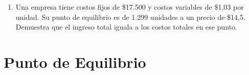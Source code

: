 \documentclass[12pt,a4paper]{article}
\newcommand{\lastanswerspace}{\vspace{2cm}}
\begin{document}
\begin{enumerate}[label=\textbf{\arabic*.}, leftmargin=*, itemsep=0pt]
\item Una empresa tiene costos fijos de \$17.500 y costos variables de \$1,03 por unidad. Su punto de equilibrio es de 1.299 unidades a un precio de \$14,5. Demuestra que el ingreso total iguala a los costos totales en ese punto.
\lastanswerspace

\end{enumerate}

\newpage

\section{Punto de Equilibrio}
\end{document}

